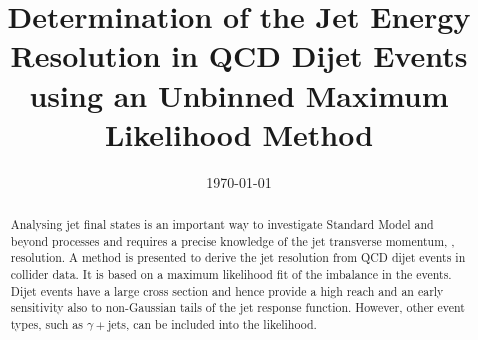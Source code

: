 \documentclass[a4paper]{cmspaper} %
\begin{document}
\begin{titlepage}
  \date{\today}
  \title{Determination of the Jet Energy Resolution in QCD Dijet
    Events using an Unbinned Maximum Likelihood Method}
  \begin{abstract}
    Analysing jet final states is an important way to investigate Standard Model and beyond processes and requires a precise knowledge of the jet transverse momentum, \pt, resolution.	
    A method is presented to derive the jet \pt resolution from QCD dijet events in collider data.
    It is based on a maximum likelihood fit of the \pt imbalance in the events.	
    Dijet events have a large cross section and hence provide a high \pt reach and an early sensitivity also to non-Gaussian tails of the jet response function.
    However, other event types, such as $\gamma+$jets, can be included into the likelihood.	
  \end{abstract}
\end{titlepage}
\tableofcontents







%




\end{document}
